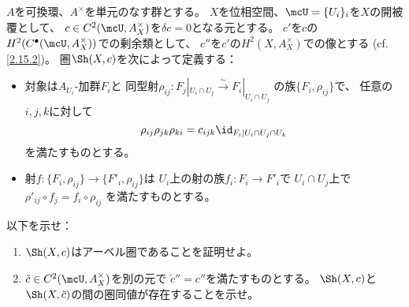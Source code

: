 \documentclass[uplatex,dvipdfmx]{jsarticle}
\begin{document}
\maketitle
\HeaderCommentA
\section{}

\fi


\begin{prob}\label{2.16}
  \(A\)を可換環、\(A^{\times}\)を単元のなす群とする。
  \(X\)を位相空間、\(\mcU=\{U_i\}_i\)を\(X\)の開被覆として、
  \(c\in C^2(\mcU,A_X^{\times})\)を\(\delta c = 0\)となる元とする。
  \(c'\)を\(c\)の\(H^2(C^{\bullet}(\mcU,A_X^{\times}))\)での剰余類として、
  \(c''\)を\(c'\)の\(H^2(X,A_X^{\times})\)での像とする
  (cf. \autoref{2.15.2})。
  圏\(\Sh(X,c)\)を次によって定義する：
  \begin{itemize}
    \item
    対象は\(A_{U_i}\)-加群\(F_i\)と
    同型射\(\rho_{ij}:F_j|_{U_i\cap U_j}\xrightarrow{\sim} F_i|_{U_i\cap U_j}\)
    の族\(\{F_i,\rho_{ij}\}\)で、
    任意の\(i,j,k\)に対して
    \[
    \rho_{ij}\rho_{jk}\rho_{ki} = c_{ijk}\id_{F_i|U_i\cap U_j\cap U_k}
    \]
    を満たすものとする。
    \item
    射\(f:\{F_i,\rho_{ij}\}\to \{F'_i,\rho_{ij}\}\)は
    \(U_i\)上の射の族\(f_i:F_i\to F'_i\)で
    \(U_i\cap U_j\)上で\(\rho'_{ij}\circ f_j = f_i\circ \rho_{ij}\)
    を満たすものとする。
  \end{itemize}
  以下を示せ：
  \begin{enumerate}
    \item \label{2.16.1}
    \(\Sh(X,c)\)はアーベル圏であることを証明せよ。
    \item \label{2.16.2}
    \(\tilde{c}\in C^2(\mcU,A_X^{\times})\)を別の元で
    \(\tilde{c}'' = c''\)を満たすものとする。
    \(\Sh(X,c)\)と\(\Sh(X,\tilde{c})\)の間の圏同値が存在することを示せ。
  \end{enumerate}
\end{prob}
\end{document}
